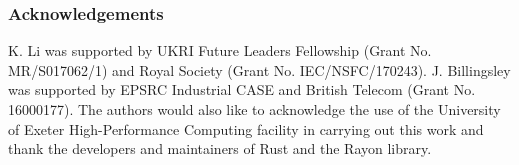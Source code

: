 \documentclass[runningheads]{llncs}
\begin{document}













\subsubsection*{Acknowledgements}
K. Li was supported by UKRI Future Leaders Fellowship (Grant No. MR/S017062/1) and Royal Society (Grant No. IEC/NSFC/170243). J. Billingsley was supported by EPSRC Industrial CASE and British Telecom (Grant No. 16000177). The authors would also like to acknowledge the use of the University of Exeter High-Performance Computing facility in carrying out this work and thank the developers and maintainers of Rust and the Rayon library.
\end{document}
